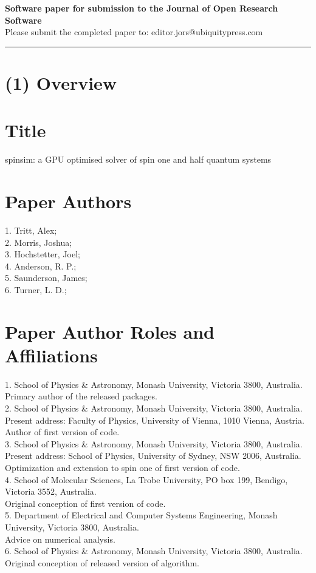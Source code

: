 \documentclass{jors}
\begin{document}
{\bf Software paper for submission to the Journal of Open Research Software} \\

Please submit the completed paper to: editor.jors@ubiquitypress.com

\rule{\textwidth}{1pt}

\section*{(1) Overview}

\vspace{0.5cm}

\section*{Title}
spinsim: a GPU optimised solver of spin one and half quantum systems

\section*{Paper Authors}
1. Tritt, Alex;\\
2. Morris, Joshua;\\
3. Hochstetter, Joel;\\
4. Anderson, R. P.;\\
5. Saunderson, James;\\
6. Turner, L. D.;\\

\section*{Paper Author Roles and Affiliations}
1. School of Physics \& Astronomy, Monash University, Victoria 3800, Australia.\\
	Primary author of the released packages.\\
2. School of Physics \& Astronomy, Monash University, Victoria 3800, Australia.\\
	Present address: Faculty of Physics, University of Vienna, 1010 Vienna, Austria.\\
	Author of first version of code.\\
3. School of Physics \& Astronomy, Monash University, Victoria 3800, Australia.\\
	Present address: School of Physics, University of Sydney, NSW 2006, Australia.\\
	Optimization and extension to spin one of first version of code.\\
4. School of Molecular Sciences, La Trobe University, PO box 199, Bendigo, Victoria 3552, Australia.\\
	Original conception of first version of code.\\
5. Department of Electrical and Computer Systems Engineering, Monash University, Victoria 3800, Australia.\\
	Advice on numerical analysis.\\
6. School of Physics \& Astronomy, Monash University, Victoria 3800, Australia.\\
	Original conception of released version of algorithm.
\end{document}
